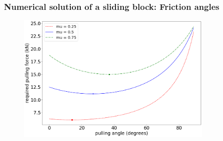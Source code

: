 \documentclass[handout]{beamer}
\begin{document}
\begin{frame}
	\frametitle{Numerical solution of a sliding block: Friction angles}	
	\begin{figure}[ht]
		\centering
		\includegraphics[width=0.85\textwidth]{figs/sliding-block-force-frictions.png}
	\end{figure}
\end{frame}
\end{document}
